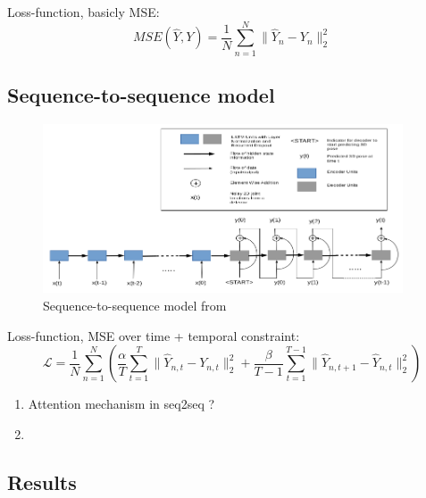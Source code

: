 \documentclass[12pt,a4paper,onecolumn]{article}
\begin{document}
Loss-function, basicly MSE:
\begin{equation}
	MSE(\widehat{Y}, Y) = \frac{1}{N}\sum_{n = 1}^N \rVert \widehat{Y}_{n} - Y_{n} \lVert_2^2
\end{equation}

\subsection{Sequence-to-sequence model}

\begin{figure}[H]
	\centering
	\includegraphics[width = 0.95\textwidth]{seq2seq_figure}
	\caption{Sequence-to-sequence model from~\parencite{hossain2017exploiting}}
	\label{fig_seq2seq_model}
\end{figure}

Loss-function, MSE over time + temporal constraint:
\begin{equation}
	\bm{\mathcal{L}} = \frac{1}{N}\sum_{n=1}^N\left(\frac{\alpha}{T}\sum_{t=1}^T\rVert \widehat{Y}_{n,t} - Y_{n,t} \lVert_2^2 + \frac{\beta}{T-1}\sum_{t = 1}^{T-1}\lVert \widehat{Y}_{n,t + 1} - \widehat{Y}_{n,t}\rVert_2^2\right)
\end{equation}

\begin{enumerate}
	\item Attention mechanism in seq2seq ?
	\item 
\end{enumerate}

\subsection{Results}
\end{document}
